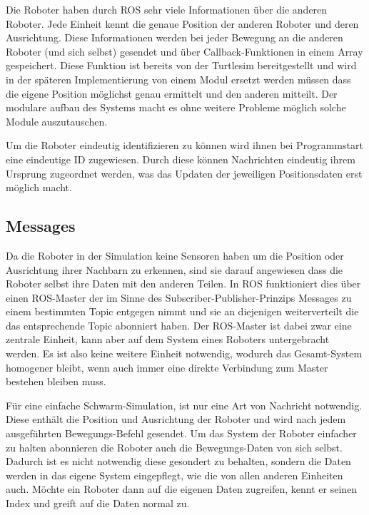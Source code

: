 Die Roboter haben durch ROS sehr viele Informationen über die anderen Roboter. Jede Einheit kennt die genaue Position der anderen Roboter und deren Ausrichtung. Diese Informationen werden bei jeder Bewegung an die anderen Roboter (und sich selbst) gesendet und über Callback-Funktionen in einem Array gespeichert. Diese Funktion ist bereits von der Turtlesim bereitgestellt und wird in der späteren Implementierung von einem Modul ersetzt werden müssen dass die eigene Position möglichst genau ermittelt und den anderen mitteilt. Der modulare aufbau des Systems macht es ohne weitere Probleme möglich solche Module auszutauschen.

Um die Roboter eindeutig identifizieren zu können wird ihnen bei Programmstart eine eindeutige ID zugewiesen. Durch diese können Nachrichten eindeutig ihrem Ursprung zugeordnet werden, was das Updaten der jeweiligen Positionsdaten erst möglich macht.

\subsection*{Messages}
Da die Roboter in der Simulation keine Sensoren haben um die Position oder Ausrichtung ihrer Nachbarn zu erkennen, sind sie darauf angewiesen dass die Roboter selbst ihre Daten mit den anderen Teilen. In ROS funktioniert dies über einen ROS-Master der im Sinne des Subscriber-Publisher-Prinzips Messages zu einem bestimmten Topic entgegen nimmt und sie an diejenigen weiterverteilt die das entsprechende Topic abonniert haben. Der ROS-Master ist dabei zwar eine zentrale Einheit, kann aber auf dem System eines Roboters untergebracht werden. Es ist also keine weitere Einheit notwendig, wodurch das Gesamt-System homogener bleibt, wenn auch immer eine direkte Verbindung zum Master bestehen bleiben muss.

Für eine einfache Schwarm-Simulation, ist nur eine Art von Nachricht notwendig. Diese enthält die Position und Ausrichtung der Roboter und wird nach jedem ausgeführten Bewegungs-Befehl gesendet. Um das System der Roboter einfacher zu halten abonnieren die Roboter auch die Bewegungs-Daten von sich selbst. Dadurch ist es nicht notwendig diese gesondert zu behalten, sondern die Daten werden in das eigene System eingepflegt, wie die von allen anderen Einheiten auch. Möchte ein Roboter dann auf die eigenen Daten zugreifen, kennt er seinen Index und greift auf die Daten normal zu.

